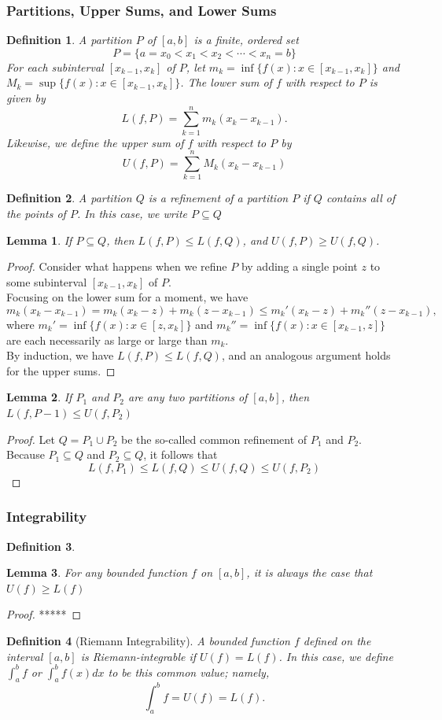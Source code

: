 \documentclass[10pt]{report}
\newtheorem{lem3}{Lemma}[subsection]
\newtheorem{def3}{Definition}[subsection]
\begin{document}
\subsubsection{Partitions, Upper Sums, and Lower Sums}
\begin{def3}A partition $P$ of $[a,b]$ is a finite, ordered set
$$P=\{a=x_0<x_1<x_2<\cdots <x_n = b\}$$
For each subinterval $[x_{k-1},x_k]$ of $P$, let $m_k = \inf\{f(x):x\in [x_{k-1},x_k]\}$ and $M_k = \sup\{f(x):x\in [x_{k-1},x_k]\}$. The lower sum of $f$ with respect to $P$ is given by
$$L(f,P) = \sum_{k=1}^n m_k(x_k-x_{k-1}).$$
Likewise, we define the upper sum of $f$ with respect to $P$ by
$$U(f,P) = \sum_{k=1}^n M_k(x_k-x_{k-1})$$
\end{def3}
\begin{def3}
A partition $Q$ is a refinement of a partition $P$ if $Q$ contains all of the points of $P$. In this case, we write $P\subseteq Q$
\end{def3}
\begin{lem3}
If $P\subseteq Q$, then $L(f,P)\leq L(f,Q)$, and $U(f,P)\geq U(f,Q)$.
\end{lem3}
\begin{proof}
Consider what happens when we refine $P$ by adding a single point $z$ to some subinterval $[x_{k-1},x_k]$ of $P$.\\
Focusing on the lower sum for a moment, we have
$$m_k(x_k-x_{k-1})=m_k(x_k-z) + m_k(z-x_{k-1})\leq m_k'(x_k-z)+m_k''(z-x_{k-1}),$$
where $m_k'=\inf\{f(x):x\in[z,x_k]\}$ and $m_k'' = \inf\{f(x):x\in [x_{k-1},z]\}$ are each necessarily as large or large than $m_k$.\\
By induction, we have $L(f,P)\leq L(f,Q)$, and an analogous argument holds for the upper sums.
\end{proof}
\begin{lem3}
If $P_1$ and $P_2$ are any two partitions of $[a,b]$, then $L(f,P-1)\leq U(f,P_2)$
\end{lem3}
\begin{proof}
Let $Q=P_1\cup P_2$ be the so-called common refinement of $P_1$ and $P_2$. Because $P_1\subseteq Q$ and $P_2\subseteq Q$, it follows that
$$L(f,P_1)\leq L(f,Q)\leq U(f,Q)\leq U(f,P_2)$$
\end{proof}
\subsubsection{Integrability}
\begin{def3}
\end{def3}
\begin{lem3}
For any bounded function $f$ on $[a,b]$, it is always the case that $U(f)\geq L(f)$
\end{lem3}
\begin{proof}
*****
\end{proof}
\begin{def3}[Riemann Integrability]
A bounded function $f$ defined on the interval $[a,b]$ is Riemann-integrable if $U(f)=L(f)$. In this case, we define $\int_a^b f$ or $\int_a^b f(x)dx$ to be this common value; namely,
$$\int_a^b f =U(f) = L(f).$$
\end{def3}
\end{document}
